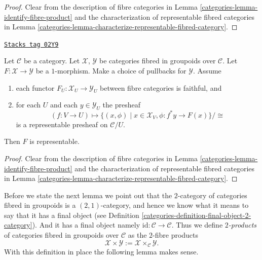 \begin{proof}

Clear from the description of fibre categories in
Lemma \ref{categories-lemma-identify-fibre-product} and the characterization
of representable fibred categories in
Lemma \ref{categories-lemma-characterize-representable-fibred-category}.
\end{proof}

\begin{lemma}
\label{categories-lemma-criterion-representable-map-stack-in-groupoids}
\href{https://stacks.math.columbia.edu/tag/02Y9}{\texttt{Stacks tag 02Y9}}

Let $\mathcal{C}$ be a category.
Let $\mathcal{X}$, $\mathcal{Y}$ be categories fibred in groupoids
over $\mathcal{C}$.
Let $F : \mathcal{X} \to \mathcal{Y}$ be a $1$-morphism.
Make a choice of pullbacks for $\mathcal{Y}$.
Assume
\begin{enumerate}
\item each functor $F_U : \mathcal{X}_U \longrightarrow \mathcal{Y}_U$
between fibre categories is faithful, and
\item for each $U$ and each $y \in \mathcal{Y}_U$ the presheaf
$$
(f : V \to U)
\longmapsto
\{(x, \phi) \mid x \in \mathcal{X}_V, \phi : f^*y \to F(x)\}/\cong
$$
is a representable presheaf on $\mathcal{C}/U$.
\end{enumerate}
Then $F$ is representable.
\end{lemma}

\begin{proof}

Clear from the description of fibre categories in
Lemma \ref{categories-lemma-identify-fibre-product} and the characterization
of representable fibred categories in
Lemma \ref{categories-lemma-characterize-representable-fibred-category}.
\end{proof}

Before we state the next lemma we point out that the $2$-category
of categories fibred in groupoids is a $(2, 1)$-category, and hence
we know what it means to say that it has a final object (see
Definition \ref{categories-definition-final-object-2-category}). And it has
a final object namely $\text{id} : \mathcal{C} \to \mathcal{C}$.
Thus we define {\it $2$-products} of categories fibred in groupoids
over $\mathcal{C}$ as the $2$-fibre products
$$
\mathcal{X} \times \mathcal{Y} :=
\mathcal{X} \times_\mathcal{C} \mathcal{Y}.
$$
With this definition in place the following lemma makes sense.

